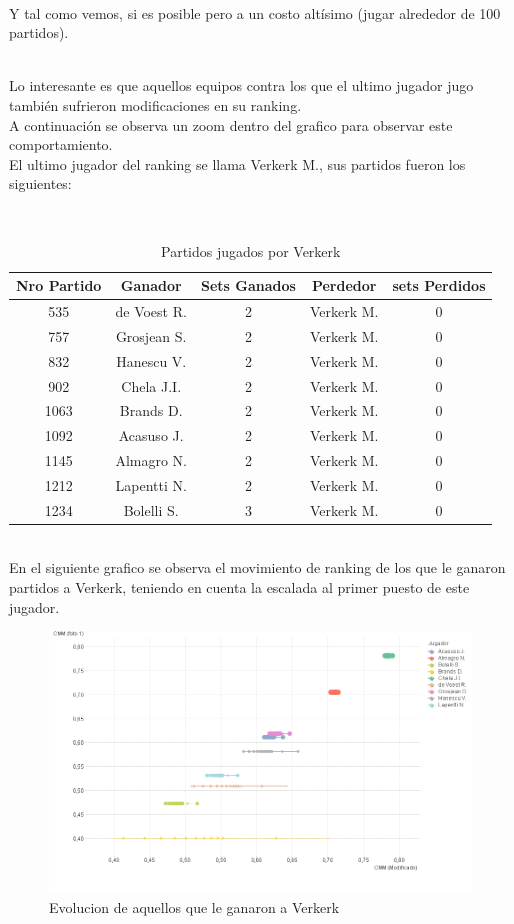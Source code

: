 \\
Y tal como vemos, si es posible pero a un costo altísimo (jugar alrededor de 100 partidos).

\\
Lo interesante es que aquellos equipos contra los que el ultimo jugador jugo también sufrieron modificaciones en su ranking. \\
A continuación se observa un zoom dentro del grafico para observar este comportamiento.
\\

El ultimo jugador del ranking se llama Verkerk M., sus partidos fueron los siguientes:

\\
\begin{table}[H]
\caption{Partidos jugados por Verkerk}
\centering
\begin{tabular}{| c | c | c | c | c |}
\hline \hline
    Nro Partido & Ganador & Sets Ganados & Perdedor & sets Perdidos \\ 
    \hline
    535 & de Voest R. & 2 & Verkerk M. & 0 \\ 
    757 & Grosjean S. & 2 & Verkerk M. & 0 \\ 
    832 & Hanescu V. & 2 & Verkerk M. & 0 \\ 
    902 & Chela J.I. & 2 & Verkerk M. & 0 \\ 
    1063 & Brands D. & 2 & Verkerk M. & 0 \\ 
    1092 & Acasuso J. & 2 & Verkerk M. & 0 \\ 
    1145 & Almagro N. & 2 & Verkerk M. & 0 \\ 
    1212 & Lapentti N. & 2 & Verkerk M. & 0 \\ 
    1234 & Bolelli S. & 3 & Verkerk M. & 0 \\ 
    \hline
    \end{tabular}
\end{table}

\\
En el siguiente grafico se observa el movimiento de ranking de los que le ganaron partidos a Verkerk, teniendo en cuenta la escalada al primer puesto de este jugador.
\\
\begin{figure}[H]
\centering
\includegraphics[width=1\textwidth]{IMG/partidos jugados vs verkerk grafico.png}
\caption{Evolucion de aquellos que le ganaron a Verkerk}
\label{fig:Evolucion de aquellos que le ganaron a Verkerk}
\end{figure}

